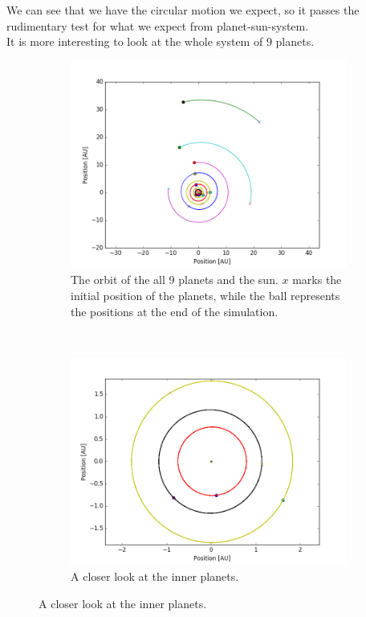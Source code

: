 \documentclass[a4paper, 10pt]{article}
\begin{document}
We can see that we have the circular motion we expect, so it passes the rudimentary test for what we expect from planet-sun-system. \\ 

It is more interesting to look at the whole system of 9 planets.

\begin{figure}[H]
\centering
\begin{subfigure}[t]{0.5\textwidth}
\centering
\includegraphics[width=\textwidth]{part2fullSystem.png}
\caption{The orbit of the all 9 planets and the sun. $x$ marks the initial position of the planets, while the ball represents the positions at the end of the simulation.}
\end{subfigure}%
~
\begin{subfigure}[t]{0.5\textwidth}
\centering
\includegraphics[width=\textwidth]{part2innerPlanets.png}
\caption{A closer look at the inner planets.}
\end{subfigure}%
\end{figure}
\end{document}
